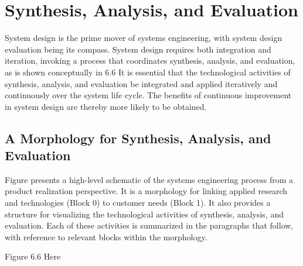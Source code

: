 \section{Synthesis, Analysis, and Evaluation}

System design is the prime mover of systems engineering, with system design evaluation being its compass. System design requires both integration and iteration, invoking a process that coordinates synthesis, analysis, and evaluation, as is shown conceptually in 6.6 It is essential that the technological activities of synthesis, analysis, and evaluation be integrated and applied iteratively and continuously over the system life cycle. The benefits of continuous improvement in system design are thereby more likely to be obtained.

\subsection{A Morphology for Synthesis, Analysis, and Evaluation}

Figure presents a high-level schematic of the systems engineering process from a product realization perspective. It is a morphology for linking applied research and technologies (Block 0) to customer needs (Block 1). It also provides a structure for visualizing the technological activities of synthesis, analysis, and evaluation. Each of these activities is summarized in the paragraphs that follow, with reference to relevant blocks within the morphology.

Figure 6.6 Here

